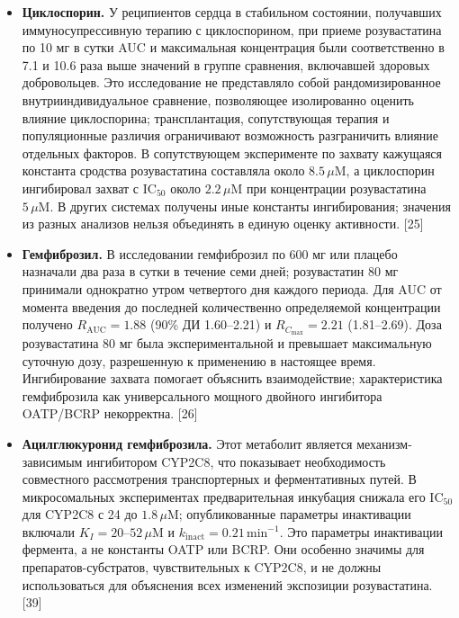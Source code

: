 \documentclass[11pt]{article}
\begin{document}
\begin{itemize}
\item \textbf{Циклоспорин.} У реципиентов сердца в стабильном состоянии, получавших иммуносупрессивную терапию с циклоспорином, при приеме розувастатина по 10 мг в сутки AUC и максимальная концентрация были соответственно в 7.1 и 10.6 раза выше значений в группе сравнения, включавшей здоровых добровольцев. Это исследование не представляло собой рандомизированное внутрииндивидуальное сравнение, позволяющее изолированно оценить влияние циклоспорина; трансплантация, сопутствующая терапия и популяционные различия ограничивают возможность разграничить влияние отдельных факторов. В сопутствующем эксперименте по захвату кажущаяся константа сродства розувастатина составляла около \(8.5\,\mu\mathrm{M}\), а циклоспорин ингибировал захват с \(\mathrm{IC}_{50}\) около \(2.2\,\mu\mathrm{M}\) при концентрации розувастатина \(5\,\mu\mathrm{M}\). В других системах получены иные константы ингибирования; значения из разных анализов нельзя объединять в единую оценку активности. [25]
\item \textbf{Гемфиброзил.} В исследовании гемфиброзил по 600 мг или плацебо назначали два раза в сутки в течение семи дней; розувастатин 80 мг принимали однократно утром четвертого дня каждого периода. Для AUC от момента введения до последней количественно определяемой концентрации получено \(R_{\mathrm{AUC}}=1.88\) (90\% ДИ 1.60--2.21) и \(R_{C_{\max}}=2.21\) (1.81--2.69). Доза розувастатина 80 мг была экспериментальной и превышает максимальную суточную дозу, разрешенную к применению в настоящее время. Ингибирование захвата помогает объяснить взаимодействие; характеристика гемфиброзила как универсального мощного двойного ингибитора OATP/BCRP некорректна. [26]
\item \textbf{Ацилглюкуронид гемфиброзила.} Этот метаболит является механизм-зависимым ингибитором CYP2C8, что показывает необходимость совместного рассмотрения транспортерных и ферментативных путей. В микросомальных экспериментах предварительная инкубация снижала его \(\mathrm{IC}_{50}\) для CYP2C8 с 24 до \(1.8\,\mu\mathrm{M}\); опубликованные параметры инактивации включали \(K_I=20\)--\(52\,\mu\mathrm{M}\) и \(k_{\mathrm{inact}}=0.21\,\mathrm{min}^{-1}\). Это параметры инактивации фермента, а не константы OATP или BCRP. Они особенно значимы для препаратов-субстратов, чувствительных к CYP2C8, и не должны использоваться для объяснения всех изменений экспозиции розувастатина. [39]

\end{itemize}
\end{document}
